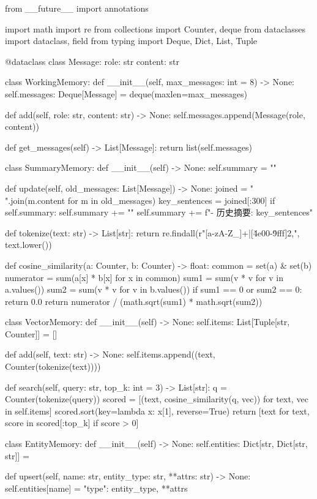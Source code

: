 \begin{codeblock}
from __future__ import annotations

import math
import re
from collections import Counter, deque
from dataclasses import dataclass, field
from typing import Deque, Dict, List, Tuple


@dataclass
class Message:
    role: str
    content: str


class WorkingMemory:
    def __init__(self, max_messages: int = 8) -> None:
        self.messages: Deque[Message] = deque(maxlen=max_messages)

    def add(self, role: str, content: str) -> None:
        self.messages.append(Message(role, content))

    def get_messages(self) -> List[Message]:
        return list(self.messages)


class SummaryMemory:
    def __init__(self) -> None:
        self.summary = ""

    def update(self, old_messages: List[Message]) -> None:
        joined = " ".join(m.content for m in old_messages)
        key_sentences = joined[:300]
        if self.summary:
            self.summary += "\n"
        self.summary += f"- 历史摘要: {key_sentences}"


def tokenize(text: str) -> List[str]:
    return re.findall(r"[a-zA-Z_]+|[\u4e00-\u9fff]{2,}", text.lower())


def cosine_similarity(a: Counter, b: Counter) -> float:
    common = set(a) & set(b)
    numerator = sum(a[x] * b[x] for x in common)
    sum1 = sum(v * v for v in a.values())
    sum2 = sum(v * v for v in b.values())
    if sum1 == 0 or sum2 == 0:
        return 0.0
    return numerator / (math.sqrt(sum1) * math.sqrt(sum2))


class VectorMemory:
    def __init__(self) -> None:
        self.items: List[Tuple[str, Counter]] = []

    def add(self, text: str) -> None:
        self.items.append((text, Counter(tokenize(text))))

    def search(self, query: str, top_k: int = 3) -> List[str]:
        q = Counter(tokenize(query))
        scored = [(text, cosine_similarity(q, vec)) for text, vec in self.items]
        scored.sort(key=lambda x: x[1], reverse=True)
        return [text for text, score in scored[:top_k] if score > 0]


class EntityMemory:
    def __init__(self) -> None:
        self.entities: Dict[str, Dict[str, str]] = {}

    def upsert(self, name: str, entity_type: str, **attrs: str) -> None:
        self.entities[name] = {"type": entity_type, **attrs}


\end{codeblock}

